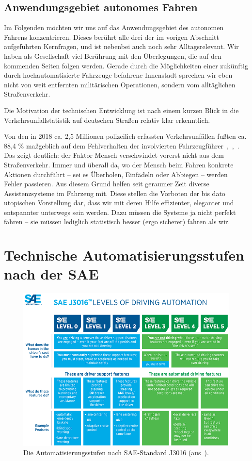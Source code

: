 \documentclass[twocolumn, german]{tum-article}
\begin{document}
\subsection{Anwendungsgebiet autonomes Fahren}
Im Folgenden möchten wir uns auf das Anwendungsgebiet des autonomen Fahrens konzentrieren.
Dieses berührt alle drei der im vorigen Abschnitt aufgeführten Kernfragen, und ist nebenbei auch noch sehr Alltagsrelevant.
Wir haben als Gesellschaft viel Berührung mit den Überlegungen, die auf den kommenden Seiten folgen werden.
Gerade durch die Möglichkeiten einer zukünftig durch hochautomatisierte Fahrzeuge befahrene Innenstadt sprechen wir eben nicht von weit entfernten militärischen Operationen, sondern vom alltäglichen Straßenverkehr.

Die Motivation der technischen Entwicklung ist nach einem kurzen Blick in die Verkehrsunfallstatistik auf deutschen Straßen relativ klar erkenntlich.

Von den in 2018 ca. 2,5 Millionen polizeilich erfassten Verkehrsunfällen fußten ca. 88,4 \% maßgeblich auf dem Fehlverhalten der involvierten Fahrzeugführer~\cite{kba-zulass},~\cite{destatis-grafik},~\cite{destatis-unfallaktuell}.
Das zeigt deutlich: der Faktor Mensch verschwindet vorerst nicht aus dem Straßenverkehr.
Immer und überall da, wo der Mensch beim Fahren konkrete Aktionen durchführt -- sei es Überholen, Einfädeln oder Abbiegen -- werden Fehler passieren.
Aus diesem Grund helfen seit geraumer Zeit diverse Assistenzsysteme im Fahrzeug mit.
Diese stellen die Vorboten der bis dato utopischen Vorstellung dar, dass wir mit deren Hilfe effizienter, eleganter und entspannter unterwegs sein werden.
Dazu müssen die Systeme ja nicht perfekt fahren -- sie müssen lediglich statistisch besser (ergo sicherer) fahren als wir.


\section{Technische Automatisierungsstufen nach der SAE}
\begin{figure}
	\includegraphics[width=\textwidth]{media/sae-levels-image}
	\caption{Die Automatisierungsstufen nach SAE-Standard J3016 (aus~\cite{sae-levels-image}).}
	\label{fig:sae-levels-img}
\end{figure}
\end{document}
